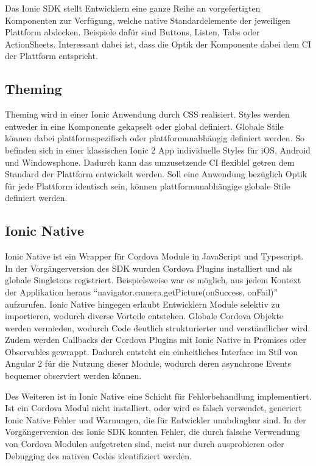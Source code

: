 Das Ionic \ac{SDK} stellt Entwicklern eine ganze Reihe an vorgefertigten Komponenten zur Verfügung,
welche native Standardelemente der jeweiligen Plattform abdecken. Beispiele dafür sind Buttons, Listen, Tabs oder ActionSheets.
Interessant dabei ist, dass die Optik der Komponente dabei dem \ac{CI} der Plattform entspricht.
\cite{ionic99:online}

\subsection{Theming}
Theming wird in einer Ionic Anwendung durch \ac{CSS} realisiert.
Styles werden entweder in eine Komponente gekapselt oder global definiert.
Globale Stile können dabei plattformspezifisch oder plattformunabhängig definiert werden.
So befinden sich in einer klassischen Ionic 2 App individuelle Styles für iOS, Android und Windowsphone.
Dadurch kann das umzusetzende \ac{CI} flexiblel getreu dem Standard der Plattform entwickelt werden.
Soll eine Anwendung bezüglich Optik für jede Plattform identisch sein,
können plattformunabhängige globale Stile definiert werden.
\cite{ionic73:online}


\subsection{Ionic Native}

Ionic Native ist ein Wrapper für Cordova Module in JavaScript und Typescript.
In der Vorgängerversion des \ac{SDK} wurden Cordova Plugins installiert und als globale Singletons registriert.
Beispielsweise war es möglich, aus jedem Kontext der Applikation heraus ``navigator.camera.getPicture(onSuccess, onFail)'' aufzurufen.
Ionic Native hingegen erlaubt Entwicklern Module selektiv zu importieren, wodurch diverse Vorteile entstehen.
Globale Cordova Objekte werden vermieden, wodurch Code deutlich strukturierter und verständlicher wird.
Zudem werden Callbacks der Cordova Plugins mit Ionic Native in Promises oder Observables gewrappt.
Dadurch entsteht ein einheitliches Interface im Stil von Angular 2 für die Nutzung dieser Module,
wodurch deren asynchrone Events bequemer observiert werden können.

Des Weiteren ist in Ionic Native eine Schicht für Fehlerbehandlung implementiert.
Ist ein Cordova Modul nicht installiert, oder wird es falsch verwendet,
generiert Ionic Native Fehler und Warnungen, die für Entwickler unabdingbar sind.
In der Vorgängerversion des Ionic \ac{SDK} konnten Fehler, die durch falsche Verwendung von
Cordova Modulen aufgetreten sind, meist nur durch ausprobieren oder Debugging des nativen Codes identifiziert werden.
\cite{ionic55:online}

